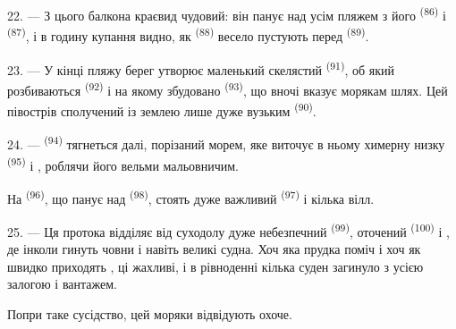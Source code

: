 22. --- З цього балкона краєвид чудовий: він панує над усім пляжем з його
 \textsuperscript{(86)} і 
\textsuperscript{(87)}, і в годину купання видно, як 
\textsuperscript{(88)} весело пустують перед 
\textsuperscript{(89)}.

23. --- У кінці пляжу берег утворює маленький скелястий 
\textsuperscript{(91)}, об який розбиваються 
\textsuperscript{(92)} і на якому збудовано  \textsuperscript{(93)},
що вночі вказує морякам шлях. Цей півострів сполучений із землею лише дуже
вузьким  \textsuperscript{(90)}.

\VUsaut{3.0mm}
\VUsaut{3.0mm}

24. ---  \textsuperscript{(94)} тягнеться далі, порізаний морем,
яке виточує в ньому химерну низку  \textsuperscript{(95)} і
, роблячи його вельми мальовничим.

На  \textsuperscript{(96)}, що панує над 
\textsuperscript{(98)}, стоять дуже важливий  \textsuperscript{(97)}
і кілька вілл.

25. --- Ця протока відділяє від суходолу дуже небезпечний 
\textsuperscript{(99)}, оточений  \textsuperscript{(100)} і
, де інколи гинуть човни і навіть великі судна. Хоч яка прудка
поміч і хоч як швидко приходять , ці  жахливі, і в рівноденні  кілька суден загинуло з усією
залогою і вантажем.

Попри таке сусідство,  цей моряки відвідують охоче.
\VUsaut{6.0mm}
\VUfilet{22mm}
